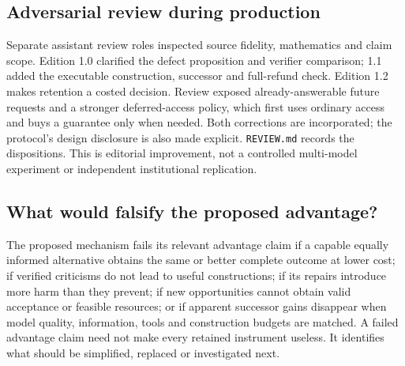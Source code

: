 \subsection{Adversarial review during production}
Separate assistant review roles inspected source fidelity, mathematics and claim scope. Edition 1.0 clarified the defect proposition and verifier comparison; 1.1 added the executable construction, successor and full-refund check. Edition 1.2 makes retention a costed decision. Review exposed already-answerable future requests and a stronger deferred-access policy, which first uses ordinary access and buys a guarantee only when needed. Both corrections are incorporated; the protocol's design disclosure is also made explicit. \texttt{REVIEW.md} records the dispositions. This is editorial improvement, not a controlled multi-model experiment or independent institutional replication.

\subsection{What would falsify the proposed advantage?}
The proposed mechanism fails its relevant advantage claim if a capable equally informed alternative obtains the same or better complete outcome at lower cost; if verified criticisms do not lead to useful constructions; if its repairs introduce more harm than they prevent; if new opportunities cannot obtain valid acceptance or feasible resources; or if apparent successor gains disappear when model quality, information, tools and construction budgets are matched. A failed advantage claim need not make every retained instrument useless. It identifies what should be simplified, replaced or investigated next.
